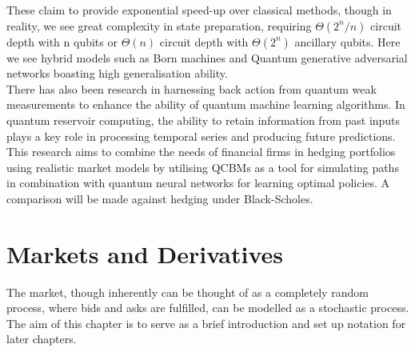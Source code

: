 \documentclass[12pt]{article}
\numberwithin{equation}{section}
\begin{document}
These claim to provide exponential speed-up over classical 
methods, though in reality, we see great complexity in state preparation, requiring 
$\Theta(2^n/n)$ circuit depth with n qubits or $\Theta(n)$ circuit depth with 
$\Theta(2^n)$ ancillary qubits.\autocite{zhang_quantum_2022} Here we see hybrid models such as Born machines
and Quantum generative adversarial networks boasting high generalisation ability.
\autocite{ganguly_implementing_nodate,gili_2022_do,horowitz_quantum_2022}
\\
There has also been research in harnessing back action from quantum weak 
measurements to enhance the ability of quantum machine learning algorithms. 
In quantum reservoir computing,
the ability to retain information from past inputs plays a key role in processing 
temporal series and producing future predictions.
\autocite{franceschetto_harnessing_2024,fujii_quantum_2020,garcia-beni_squeezing_2024,mujal_time-series_2023}  
\\
This research aims to combine the needs of financial firms in hedging portfolios
using realistic market models by utilising QCBMs as a tool 
for simulating paths in combination with quantum neural networks for learning 
optimal policies. A comparison will be made against hedging under Black-Scholes.


\clearpage
\section{Markets and Derivatives}
The market, though inherently can be thought of as a completely random process,
where bids and asks are fulfilled, can be modelled as a stochastic process. The 
aim of this chapter is to serve as a brief introduction and set up notation for 
later chapters. \\
\end{document}
